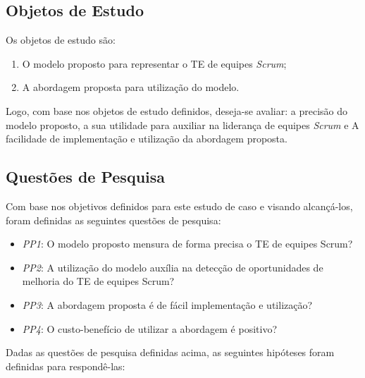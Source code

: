 \subsection{Objetos de Estudo}
\label{estudodecaso:design:objetos}

Os objetos de estudo são:

\begin{enumerate}
  \item O modelo proposto para representar o TE de equipes \textit{Scrum};
  \item A abordagem proposta para utilização do modelo.
\end{enumerate}

Logo, com base nos objetos de estudo definidos, deseja-se avaliar: a precisão do modelo proposto, a sua utilidade para auxiliar na liderança de equipes \textit{Scrum} e A facilidade de implementação e utilização da abordagem proposta.

\subsection{Questões de Pesquisa}
\label{estudodecaso:design:perguntas}

Com base nos objetivos definidos para este estudo de caso e visando alcançá-los, foram definidas as seguintes questões de pesquisa:

\begin{itemize}
  \item \textit{PP1}: O modelo proposto mensura de forma precisa o TE de equipes Scrum?
  \item \textit{PP2}: A utilização do modelo auxília na detecção de oportunidades de melhoria do TE de equipes Scrum?
  \item \textit{PP3}: A abordagem proposta é de fácil implementação e utilização?
  \item \textit{PP4}: O custo-benefício de utilizar a abordagem é positivo?
\end{itemize}

Dadas as questões de pesquisa definidas acima, as seguintes hipóteses foram definidas para respondê-las:

